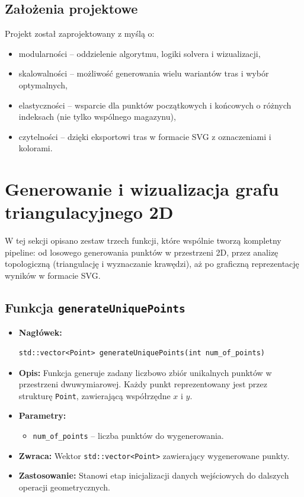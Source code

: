 \documentclass{article}
\begin{document}
\subsection*{Założenia projektowe}

Projekt został zaprojektowany z myślą o:
\begin{itemize}
    \item modularności – oddzielenie algorytmu, logiki solvera i wizualizacji,
    \item skalowalności – możliwość generowania wielu wariantów tras i wybór optymalnych,
    \item elastyczności – wsparcie dla punktów początkowych i końcowych o różnych indeksach (nie tylko wspólnego magazynu),
    \item czytelności – dzięki eksportowi tras w formacie SVG z oznaczeniami i kolorami.
\end{itemize}

\section{Generowanie i wizualizacja grafu triangulacyjnego 2D}

W tej sekcji opisano zestaw trzech funkcji, które wspólnie tworzą kompletny pipeline: od losowego generowania punktów w przestrzeni 2D, przez analizę topologiczną (triangulację i wyznaczanie krawędzi), aż po graficzną reprezentację wyników w formacie SVG.

\subsection{Funkcja \texttt{generateUniquePoints}}

\begin{itemize}
    \item \textbf{Nagłówek:}
    \begin{verbatim}
std::vector<Point> generateUniquePoints(int num_of_points)
    \end{verbatim}
    
    \item \textbf{Opis:} 
    Funkcja generuje zadany liczbowo zbiór unikalnych punktów w przestrzeni dwuwymiarowej. Każdy punkt reprezentowany jest przez strukturę \texttt{Point}, zawierającą współrzędne $x$ i $y$.

    \item \textbf{Parametry:}
    \begin{itemize}
        \item \texttt{num\_of\_points} – liczba punktów do wygenerowania.
    \end{itemize}

    \item \textbf{Zwraca:}
    Wektor \texttt{std::vector<Point>} zawierający wygenerowane punkty.

    \item \textbf{Zastosowanie:}
    Stanowi etap inicjalizacji danych wejściowych do dalszych operacji geometrycznych.
\end{itemize}
\end{document}
